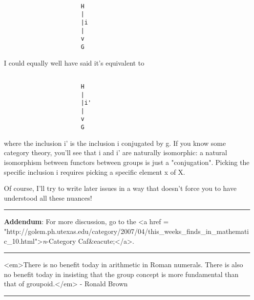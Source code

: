 \begin{verbatim}

                      H
                      |
                      |i
                      |
                      v
                      G
\end{verbatim}
    
I could equally well have said it's equivalent to 


\begin{verbatim}

                      H
                      |
                      |i'
                      |
                      v
                      G
\end{verbatim}
    
where the inclusion i' is the inclusion i conjugated by g.  If you
know some category theory, you'll see that i and i' are naturally
isomorphic: a natural isomorphism between functors between groups 
is just a "conjugation".  Picking the specific inclusion i requires
picking a specific element x of X.

Of course, I'll try to write later issues in a way that doesn't force
you to have understood all these nuances!

\par\noindent\rule{\textwidth}{0.4pt}
\textbf{Addendum}: For more discussion, go to the <a href =
"http://golem.ph.utexas.edu/category/2007/04/this_weeks_finds_in_mathematic_10.html">\emph{n}-Category
Caf&eacute;</a>.

\par\noindent\rule{\textwidth}{0.4pt}
<em>There is no benefit today in arithmetic in Roman numerals.
There is also no benefit today in insisting that the group concept
is more fundamental than that of groupoid.</em> - Ronald Brown
\par\noindent\rule{\textwidth}{0.4pt}

